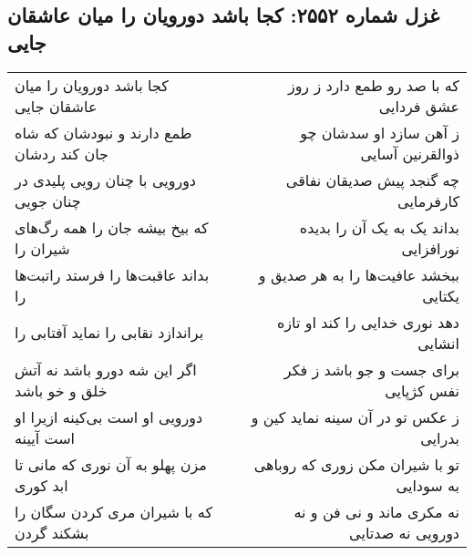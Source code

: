 \begin{center}
\section*{غزل شماره ۲۵۵۲: کجا باشد دورویان را میان عاشقان جایی}
\label{sec:2552}
\begin{longtable}{l p{0.5cm} r}
کجا باشد دورویان را میان عاشقان جایی
&&
که با صد رو طمع دارد ز روز عشق فردایی
\\
طمع دارند و نبودشان که شاه جان کند ردشان
&&
ز آهن سازد او سدشان چو ذوالقرنین آسایی
\\
دورویی با چنان رویی پلیدی در چنان جویی
&&
چه گنجد پیش صدیقان نفاقی کارفرمایی
\\
که بیخ بیشه جان را همه رگ‌های شیران را
&&
بداند یک به یک آن را بدیده نورافزایی
\\
بداند عاقبت‌ها را فرستد راتبت‌ها را
&&
ببخشد عافیت‌ها را به هر صدیق و یکتایی
\\
براندازد نقابی را نماید آفتابی را
&&
دهد نوری خدایی را کند او تازه انشایی
\\
اگر این شه دورو باشد نه آتش خلق و خو باشد
&&
برای جست و جو باشد ز فکر نفس کژپایی
\\
دورویی او است بی‌کینه ازیرا او است آیینه
&&
ز عکس تو در آن سینه نماید کین و بدرایی
\\
مزن پهلو به آن نوری که مانی تا ابد کوری
&&
تو با شیران مکن زوری که روباهی به سودایی
\\
که با شیران مری کردن سگان را بشکند گردن
&&
نه مکری ماند و نی فن و نه دورویی نه صدتایی
\\
\end{longtable}
\end{center}
